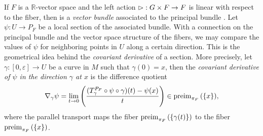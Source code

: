 If \(F\) is a \(\mathbb{R}\)-vector space and the left action \(\mathbin{\vartriangleright} : G \times F \to F\) is linear with respect to the fiber, then  is a \emph{vector bundle} associated to the principal bundle . Let \(\psi : U \to P_F\) be a local section of the associated bundle. With a connection on the principal bundle and the vector space structure of the fibers, we may compare the values of \(\psi\) for neighboring points in \(U\) along a certain direction. This is the geometrical idea behind the \emph{covariant derivative} of a section. More precisely, let \(\gamma : [0, \varepsilon] \to U\) be a curve in \(M\) such that \(\gamma(0) = x\), then the \emph{covariant derivative of \(\psi\) in the direction \(\gamma\) at \(x\)} is the difference quotient
\begin{equation*}
    \nabla_{\gamma}\psi = \lim_{t \to 0}\left(\frac{(T_{\gamma}^{P_F}\circ \psi \circ \gamma)(t) - \psi(x)}{t}\right) \in \operatorname{preim}_{\pi_F}{\left(\{x\}\right)},
\end{equation*}
where the parallel transport maps the fiber \(\operatorname{preim}_{\pi_F}{\left(\{\gamma(t)\}\right)}\) to the fiber \(\operatorname{preim}_{\pi_F}{\left(\{x\}\right)}\).
